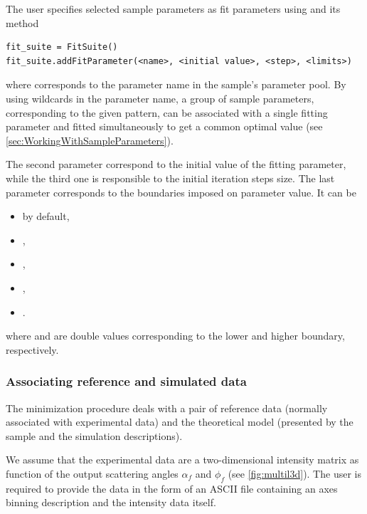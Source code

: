 The user specifies selected sample parameters as fit parameters using 
and its  method
\begin{lstlisting}[language=shell, style=commandline]
fit_suite = FitSuite()
fit_suite.addFitParameter(<name>, <initial value>, <step>, <limits>)
\end{lstlisting}
where  corresponds to the parameter name in the sample's parameter pool.
By using wildcards in the parameter name, a group of sample parameters, corresponding to the given
pattern, can be associated with a single fitting parameter and
fitted simultaneously to get a common optimal value (see \cref{sec:WorkingWithSampleParameters}).

The second parameter  correspond to the initial value of
the fitting parameter, while the third one
is responsible to the initial iteration steps size.
The last parameter  corresponds to
the boundaries imposed on parameter value. It can be
\begin{itemize}
\item {} by default,
\item {},
\item {},
\item {},
\item {}.
\end{itemize}
where  and  are
double values corresponding to the lower and higher boundary, respectively.


\subsubsection{Associating reference and simulated data}

The minimization procedure deals with a pair of reference data (normally
associated with experimental data) and the theoretical model (presented by the sample and the simulation descriptions).

We assume that the experimental data are a two-dimensional intensity
matrix as function of the output scattering
angles $\alpha_f$ and $\phi_f$ (see \cref{fig:multil3d}).
The user is required to provide the data in the form of an ASCII file
containing an axes
binning description and the intensity data itself.
\vspace*{2mm}

